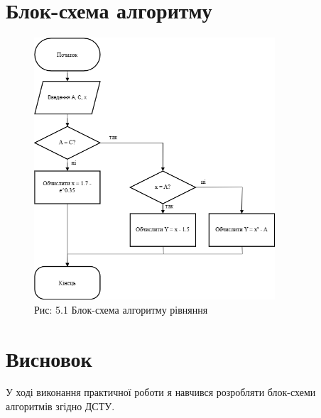 \documentclass[a4paper]{article}
\begin{document}
\section*{Блок-схема алгоритму}

\begin{figure}[h]
    \centering
    \includegraphics[width=0.8\textwidth]{imgs/PW5.drawio.png}
    \caption*{Рис: 5.1 Блок-схема алгоритму рівняння}
\end{figure}

\section*{Висновок}
У ході виконання практичної роботи я навчився  розробляти блок-схеми алгоритмів згідно ДСТУ.
\end{document}

